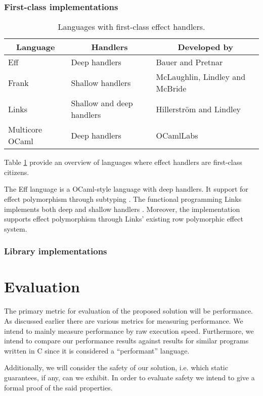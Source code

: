 \documentclass[preprint,10pt,numbers]{sigplanconf}
\begin{document}
  \subsubsection{First-class implementations}\label{sec:first-class}
  \begin{table}[H]
    \centering 
    \begin{tabular}{| l | l | l |}
      \hline
      \multicolumn{1}{|c|}{Language} & \multicolumn{1}{c|}{Handlers} & \multicolumn{1}{c|}{Developed by} \\
      \hline
      Eff & Deep handlers & Bauer and Pretnar \\ 
      \hline
      Frank & Shallow handlers & McLaughlin, Lindley and McBride \\    
      \hline
      Links & Shallow and deep handlers & Hillerström and Lindley\\
      \hline
      Multicore OCaml & Deep handlers & OCamlLabs \\
      \hline    
    \end{tabular}\caption{Languages with first-class effect handlers.}\label{tbl:impls}
  \end{table}
  Table \ref{tbl:impls} provide an overview of languages where effect handlers are first-class citizens. 

The Eff language is a OCaml-style language with deep handlers. It support for effect polymorphism through subtyping \cite{Bauer2015}. 
The functional programming Links implements both deep and shallow handlers \cite{Hillerstrom2015}. Moreover, the implementation supports effect polymorphism through Links' existing row polymorphic effect system.
    
  \subsubsection{Library implementations}\label{sec:library}

  \section{Evaluation}
  The primary metric for evaluation of the proposed solution will be performance. As discussed earlier there are various metrics for measuring performance. We intend to mainly measure performance by raw execution speed. Furthermore, we intend to compare our performance results against results for similar programs written in C since it is considered a ``performant'' language. 

Additionally, we will consider the safety of our solution, i.e. which static guarantees, if any, can we exhibit. In order to evaluate safety we intend to give a formal proof of the said properties.
\end{document}
